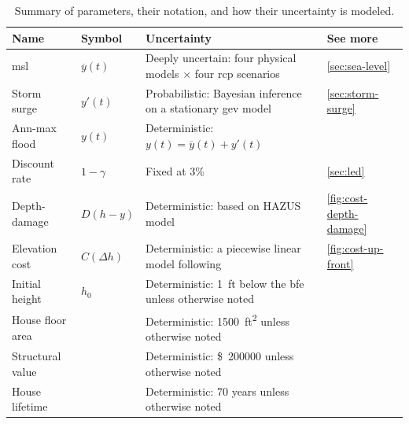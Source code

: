 \documentclass[12pt]{article}
\newcommand{\usd}[1]{\SI{#1}[\$]{}}
\begin{document}
\begin{table}
    \centering
    \caption{
        Summary of parameters, their notation, and how their uncertainty is modeled.
    }\label{tab:uncertainties}
    \begin{tabular}{l l p{3in} l}
        \toprule
        Name             & Symbol            & Uncertainty                                                                          & See more                     \\
        \midrule
        \Gls{msl}        & $\overline{y}(t)$ & Deeply uncertain: four physical models $\times$ four \acrshort{rcp} scenarios        & \cref{sec:sea-level}         \\
        Storm surge      & $y'(t)$           & Probabilistic: Bayesian inference on a stationary \acrshort{gev} model               & \cref{sec:storm-surge}       \\
        Ann-max flood    & $y(t)$            & Deterministic: $y(t)=\overline{y}(t)+y'(t)$                                          &                              \\
        Discount rate    & $1-\gamma$        & Fixed at 3\%                                                                         & \cref{sec:led}               \\
        Depth-damage     & $D(h-y)$          & Deterministic: based on HAZUS model                                                  & \cref{fig:cost-depth-damage} \\
        Elevation cost   & $C(\Delta h)$     & Deterministic: a piecewise linear model following \citet{zarekarizi_suboptimal:2020} & \cref{fig:cost-up-front}     \\
        Initial height   & $h_0$             & Deterministic: \SI{1}{ft} below the \gls{bfe} unless otherwise noted                 &                              \\
        House floor area &                   & Deterministic: \SI{1500}{ft^2} unless otherwise noted                                &                              \\
        Structural value &                   & Deterministic: \usd{200000} unless otherwise noted                                   &                              \\
        House lifetime   &                   & Deterministic: 70 years unless otherwise noted                                       &                              \\
        \bottomrule
    \end{tabular}
\end{table}
\end{document}
